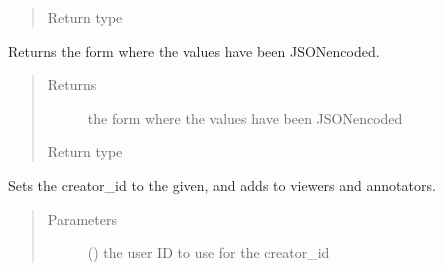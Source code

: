\documentclass[letterpaper,10pt,english]{sphinxmanual}
\begin{document}
\begin{fulllineitems}
\begin{fulllineitems}
\begin{quote}
\begin{description}
\item[{Return type}] \leavevmode
\sphinxAtStartPar
{}

\end{description}\end{quote}

\end{fulllineitems}


\begin{fulllineitems}
\label{\detokenize{autoapi/pine/client/index:pine.client.CollectionBuilder.form_json}}
\sphinxAtStartPar
Returns the form where the values have been JSON\sphinxhyphen{}encoded.
\begin{quote}\begin{description}
\item[{Returns}] \leavevmode
\sphinxAtStartPar
the form where the values have been JSON\sphinxhyphen{}encoded

\item[{Return type}] \leavevmode
\sphinxAtStartPar
{}

\end{description}\end{quote}

\end{fulllineitems}


\begin{fulllineitems}
\label{\detokenize{autoapi/pine/client/index:pine.client.CollectionBuilder.creator_id}}
\sphinxAtStartPar
Sets the creator\_id to the given, and adds to viewers and annotators.
\begin{quote}\begin{description}
\item[{Parameters}] \leavevmode
\sphinxAtStartPar
{} () \textendash{} the user ID to use for the creator\_id


\end{description}
\end{quote}
\end{fulllineitems}
\end{fulllineitems}
\end{document}

